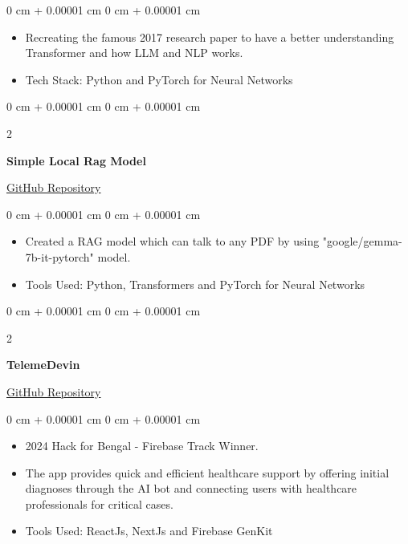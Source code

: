 \documentclass[9pt, letterpaper]{extarticle}
\newenvironment{highlights}{
    \begin{itemize}[
        topsep=0.10 cm,
        parsep=0.10 cm,
        partopsep=0pt,
        itemsep=0pt,
        leftmargin=0 cm + 10pt
    ]
}{
    \end{itemize}
} %
\newenvironment{onecolentry}{
    \begin{adjustwidth}{
        0 cm + 0.00001 cm
    }{
        0 cm + 0.00001 cm
    }
}{
    \end{adjustwidth}
} %
\newenvironment{twocolentry}[2][]{
    \onecolentry
    \def\secondColumn{#2}
    \setcolumnwidth{\fill, 4.5 cm}
    \begin{paracol}{2}
}{
    \switchcolumn \raggedleft \secondColumn
    \end{paracol}
    \endonecolentry
} %
\begin{document}
\vspace{0.10 cm}

\begin{onecolentry}
    \begin{highlights}
        \item Recreating the famous 2017 research paper to have a better understanding  Transformer and how LLM and NLP works.
        \item Tech Stack: Python and PyTorch for Neural Networks
    \end{highlights}
\end{onecolentry}

\vspace{0.2 cm}

\begin{twocolentry}{
    \href{https://github.com/debarshee2004/simple-local-rag}{GitHub Repository}
}
    \textbf{Simple Local Rag Model}
\end{twocolentry}

\vspace{0.10 cm}

\begin{onecolentry}
    \begin{highlights}
        \item Created a RAG model which can talk to any PDF by using "google/gemma-7b-it-pytorch" model.
        \item Tools Used: Python, Transformers and PyTorch for Neural Networks
    \end{highlights}
\end{onecolentry}

\vspace{0.2 cm}

\begin{twocolentry}{
    \href{https://github.com/debarshee2004/telemedevin}{GitHub Repository}
}
    \textbf{TelemeDevin}
\end{twocolentry}

\vspace{0.10 cm}

\begin{onecolentry}
    \begin{highlights}
        \item 2024 Hack for Bengal - Firebase Track Winner.
        \item The app provides quick and efficient healthcare support by offering initial diagnoses through the AI bot and connecting users with healthcare professionals for critical cases.
        \item Tools Used: ReactJs, NextJs and Firebase GenKit
    \end{highlights}
\end{onecolentry}
\vspace{0.2 cm}
\end{document}
